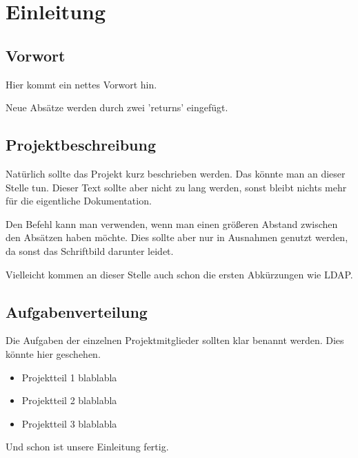 \section{Einleitung}
\subsection{Vorwort}
Hier kommt ein nettes Vorwort hin. 

Neue Absätze werden durch zwei 'returns' eingefügt.

\subsection{Projektbeschreibung}
Natürlich sollte das Projekt kurz beschrieben werden. Das könnte man an dieser Stelle tun. Dieser Text sollte 
aber nicht zu lang werden, sonst bleibt nichts mehr für die eigentliche Dokumentation.


\par\bigskip
Den Befehl  kann man verwenden, wenn man einen größeren Abstand zwischen den Absätzen haben
möchte. Dies sollte aber nur in Ausnahmen genutzt werden, da sonst das Schriftbild darunter leidet.

Vielleicht kommen an dieser Stelle auch schon die ersten Abkürzungen wie \ac{LDAP}.

\subsection{Aufgabenverteilung}
Die Aufgaben der einzelnen Projektmitglieder sollten klar benannt werden.
Dies könnte hier geschehen.
\begin{itemize}
\item Projektteil 1 blablabla
\item Projektteil 2 blablabla
\item Projektteil 3 blablabla
\end{itemize}

Und schon ist unsere Einleitung fertig. \Winkey
